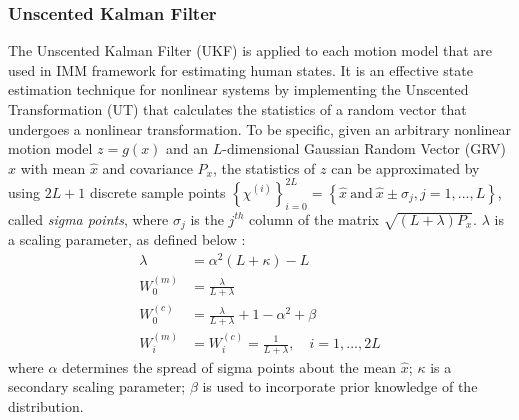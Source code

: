 \documentclass[journal]{IEEEtran}
\begin{document}
	\subsubsection{Unscented Kalman Filter}\label{subsec:UKF}
	The Unscented Kalman Filter (UKF) is applied to each motion model that are used in IMM framework for estimating human states. 
	It is an effective state estimation technique for nonlinear systems by implementing the Unscented Transformation (UT) that calculates the statistics of a random vector that undergoes a nonlinear transformation\cite {haykin2004kalman}.
	To be specific, given an arbitrary nonlinear motion model $z=g(x)$ and an $L$-dimensional Gaussian Random Vector (GRV) $x$ with mean $\hat{x}$ and covariance $P_x$, the statistics of $z$ can be approximated by using $2L+1$ discrete sample points $\left\{\chi^{(i)} \right\}_{i=0}^{2L}=\left\{ \hat{x}\ \text{and}\  \hat{x} \pm \sigma_j, j=1,...,L\right \}$, called \textit{sigma points}, where $\sigma_j$ is the $j^{th}$ column of the matrix $\sqrt{(L+\lambda)P_x}$. $\lambda$ is a scaling parameter, as defined below \cite{hong2013vehicle}:	
	\small	\begin{subequations}\label{eqn:ukf}
		\begin{align}
		\lambda&=\alpha^2(L+\kappa)-L  \\
		W_0^{(m)}&=\frac{\lambda}{L+\lambda}\\
		W_0^{(c)}&=\frac{\lambda}{L+\lambda}+1-\alpha^2+\beta\\
		W_i^{(m)}&=W_i^{(c)}=\frac{1}{L+\lambda},\quad i=1,...,2L 
		\end{align}
	\end{subequations}\normalsize
	where $\alpha$ determines the spread of sigma points about the mean $\hat{x}$; $\kappa$ is a secondary scaling parameter; $\beta$ is used to incorporate prior knowledge of the distribution.	
	
\end{document}
